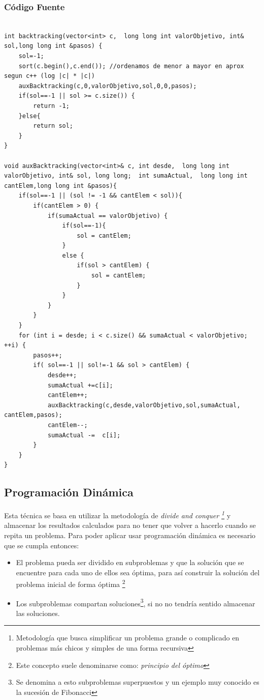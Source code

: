 \documentclass[7pt,a4paper]{article}
\begin{document}
\subsubsection{Código Fuente}
\begin{lstlisting}

int backtracking(vector<int> c,  long long int valorObjetivo, int& sol,long long int &pasos) {
    sol=-1;
    sort(c.begin(),c.end()); //ordenamos de menor a mayor en aprox segun c++ (log |c| * |c|)
    auxBacktracking(c,0,valorObjetivo,sol,0,0,pasos);
    if(sol==-1 || sol >= c.size()) {
        return -1;
    }else{
        return sol;
    }
}

void auxBacktracking(vector<int>& c, int desde,  long long int valorObjetivo, int& sol, long long;  int sumaActual,  long long int cantElem,long long int &pasos){
    if(sol==-1 || (sol != -1 && cantElem < sol)){
        if(cantElem > 0) {
            if(sumaActual == valorObjetivo) {
                if(sol==-1){
                    sol = cantElem;
                }
                else {
                    if(sol > cantElem) {
                        sol = cantElem;
                    }
                }
            }
        }
    }
    for (int i = desde; i < c.size() && sumaActual < valorObjetivo; ++i) {
        pasos++;
        if( sol==-1 || sol!=-1 && sol > cantElem) {
            desde++;
            sumaActual +=c[i];
            cantElem++;
            auxBacktracking(c,desde,valorObjetivo,sol,sumaActual, cantElem,pasos);
            cantElem--;
            sumaActual -=  c[i];
        }
    }
}

\end{lstlisting}

\subsection{Programación Dinámica}

Esta técnica se basa en utilizar la metodología de {\it divide and conquer \footnote{Metodología que busca simplificar un problema grande o complicado en problemas más chicos y simples de una forma recursiva}} y almacenar los resultados calculados para no tener que volver a hacerlo cuando se repita un problema. Para poder aplicar usar programación dinámica es necesario que se cumpla entonces: 
\begin{itemize}
	\item
	El problema pueda ser dividido en subproblemas y que la solución que se encuentre para cada uno de ellos sea óptima, para así construir la solución del problema inicial de forma óptima \footnote{Este concepto suele denominarse como: {\it principio del óptimo}}
	
	\item 	
	Los subproblemas compartan soluciones\footnote{Se denomina a esto subproblemas superpuestos y un ejemplo muy conocido es la sucesión de Fibonacci}, si no no tendría sentido almacenar las soluciones.
\end{itemize}
\end{document}
